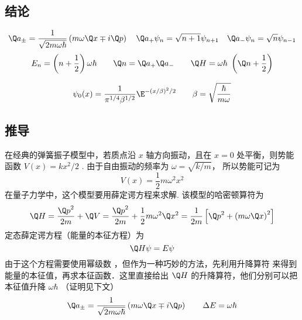 

\subsection{结论}
\begin{equation}
{\Q a_ \pm } = \frac{1}{{\sqrt {2m\omega \hbar } }}\left( {m\omega \Q x \mp i\Q p} \right)
\quad
{\Q a_ + }{\psi _n} = \sqrt {n + 1}    {\psi _{n + 1}}
\quad
{\Q a_ - }{\psi _n} = \sqrt n    {\psi _{n - 1}}
\end{equation}
\begin{equation}
 {E_n} = \left( {n+\frac{1}{2} } \right)\omega \hbar
\qquad
\Q n = {\Q a_ + }{\Q a_ - }
\qquad
\Q H = \omega \hbar {\text{ }}\left( {\Q n + \frac{1}{2}} \right)
\end{equation}

\begin{equation}
\psi_0 (x) = \frac{1}{{{\pi ^{1/4}}{\beta ^{1/2}}}}{\E^{ - {{(x/\beta )}^2}/2}}  \qquad \beta  = \sqrt {\frac{\hbar }{{m\omega }}}
\end{equation}

\subsection{推导}
在经典的弹簧振子模型中，若质点沿 $x$ 轴方向振动，且在 $x = 0$ 处平衡，则势能函数 $V\left( x \right) = k{x^2}/{2}$ . 由于自由振动的频率为 $\omega  = \sqrt {{k}/{m}} $， 所以势能可记为
\begin{equation}
  V\left( x \right) = \frac{1}{2}m{\omega ^2}{x^2}
\end{equation}
在量子力学中，这个模型要用薛定谔方程来求解. 该模型的哈密顿算符为
\begin{equation}
  \Q H = \frac{{{{\Q p}^2}}}{{2m}} + \Q V = \frac{{{{\Q p}^2}}}{{2m}} + \frac{1}{2}m{\omega ^2}{\Q x^2} = \frac{1}{{2m}}\left[ {{{\Q p}^2} + {{\left( {m\omega \Q x} \right)}^2}} \right]
\end{equation}
定态薛定谔方程（能量的本征方程）为
\begin{equation}\label{QSHOop_eq6}
  \Q H\psi  = E\psi
\end{equation}
由于这个方程需要使用幂级数%
，但作为一种巧妙的方法，先利用升降算符%
来得到能量的本征值，再求本征函数．这里直接给出 $\Q H$ 的升降算符，他们分别可以把本征值升降 $\omega\hbar$ （证明见下文）
\begin{equation}
{\Q a_ \pm } = \frac{1}{{\sqrt {2m\omega \hbar } }}\left( {m\omega \Q x \mp i\Q p} \right)
\qquad
\Delta E = \omega \hbar
\end{equation}


